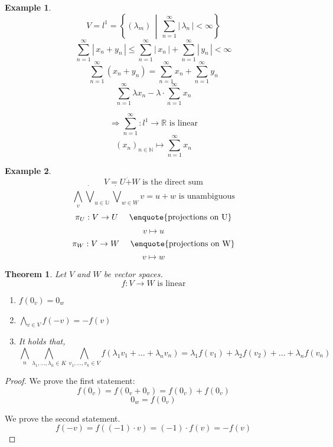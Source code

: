 \documentclass[a4paper,landscape,twocolumn]{article}
\newcommand\abs[1]{|\,#1\,|}
\newcommand\setdef[2]{\left\{#1\,\middle|\,#2\right\}}
\newtheorem{theorem}{Theorem}
\newtheorem{ex}{Example}
\begin{document}
\begin{ex}
  \[ V = l^1 = \setdef{(\lambda_m)}{\sum_{n=1}^\infty \abs{\lambda_n} < \infty} \]
  \[ \sum_{n=1}^\infty \abs{x_n + y_n} \leq \sum_{n=1}^\infty \abs{x_n} + \sum_{n=1}^\infty \abs{y_n} < \infty \]
  \[ \sum_{n=1}^\infty (x_n + y_n) = \sum_{n=1}^\infty x_n + \sum_{n=1}^\infty y_n \]
  \[ \sum_{n=1}^\infty \lambda x_n - \lambda \cdot \sum_{n=1}^\infty x_n \]

  \[ \Rightarrow \sum_{n=1}^\infty: l^1 \rightarrow \mathbb R \text{ is linear} \]
  \[ (x_n)_{n\in\mathbb N} \mapsto \sum_{n=1}^\infty x_n \]
\end{ex}

\begin{ex}
  \[ V = U \dot{+} W \text{ is the direct sum} \]
  \[ \bigwedge_v \dot\bigvee_{u \in \mathbb U} \dot\bigvee_{w \in W} v = u + w \text{ is unambiguous} \]
  \[ \pi_U: V \rightarrow U \quad\text{ \enquote{projections on U}} \]
  \[ v \mapsto u \]
  \[ \pi_W: V \rightarrow W \quad\text{ \enquote{projections on W}} \]
  \[ v \mapsto w \]
\end{ex}

\begin{theorem}
  Let $V$ and $W$ be vector spaces.
  \[ f: V \rightarrow W \text{ is linear} \]
  \begin{enumerate}
    \item $f(0_v) = 0_w$
    \item $\bigwedge_{v \in V} f(-v) = -f(v)$
    \item It holds that,
      \[
        \bigwedge_{n} \bigwedge_{\lambda_1, \dots, \lambda_n \in K} \bigwedge_{v_1, \dots, v_k \in V}
        f(\lambda_1 v_1 + \dots + \lambda_n v_n) = \lambda_1 f(v_1) + \lambda_2 f(v_2) + \dots + \lambda_n f(v_n)
      \]
  \end{enumerate}
\end{theorem}
\begin{proof}
  We prove the first statement:
  \[ f(0_v) = f(0_v + 0_v) = f(0_v) + f(0_v) \]
  \[ 0_w = f(0_v) \]

  We prove the second statement.
  \[ f(-v) = f((-1) \cdot v) = (-1) \cdot f(v) = -f(v) \]
\end{proof}
\end{document}
